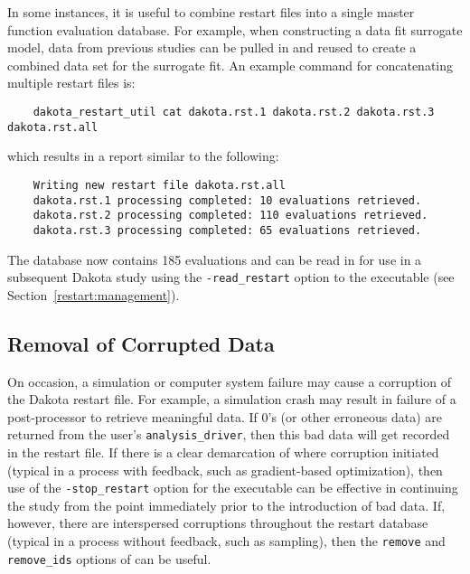 In some instances, it is useful to combine restart files into a single
master function evaluation database. For example, when constructing a
data fit surrogate model, data from previous studies can be pulled in
and reused to create a combined data set for the surrogate fit. An
example command for concatenating multiple restart files is:
\begin{small}
\begin{verbatim}
    dakota_restart_util cat dakota.rst.1 dakota.rst.2 dakota.rst.3 dakota.rst.all
\end{verbatim}
\end{small}
which results in a report similar to the following:
\begin{verbatim}
    Writing new restart file dakota.rst.all
    dakota.rst.1 processing completed: 10 evaluations retrieved.
    dakota.rst.2 processing completed: 110 evaluations retrieved.
    dakota.rst.3 processing completed: 65 evaluations retrieved.
\end{verbatim}

The  database now contains 185 evaluations and
can be read in for use in a subsequent Dakota study using the
\texttt{-read\_restart} option to the  executable (see
Section~\ref{restart:management}).

\subsection{Removal of Corrupted Data}\label{restart:utility:removal}

On occasion, a simulation or computer system failure may cause a
corruption of the Dakota restart file. For example, a simulation crash
may result in failure of a post-processor to retrieve meaningful data.
If 0's (or other erroneous data) are returned from the user's
\texttt{analysis\_driver}, then this bad data will get recorded in the
restart file. If there is a clear demarcation of where corruption
initiated (typical in a process with feedback, such as gradient-based
optimization), then use of the \texttt{-stop\_restart} option for the
 executable can be effective in continuing the study
from the point immediately prior to the introduction of bad data. If,
however, there are interspersed corruptions throughout the restart
database (typical in a process without feedback, such as sampling),
then the \texttt{remove} and \texttt{remove\_ids} options of
 can be useful.

